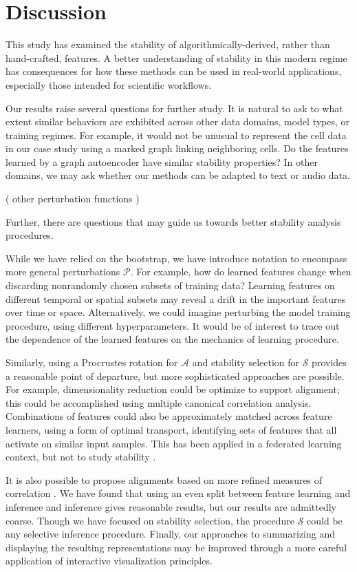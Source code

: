 
\section{Discussion}

This study has examined the stability of algorithmically-derived, rather than
hand-crafted, features. A better understanding of stability in this modern
regime has consequences for how these methods can be used in real-world
applications, especially those intended for scientific workflows.

Our results raise several questions for further study. It is natural to ask
to what extent similar behaviors are exhibited across other data domains, model
types, or training regimes. For example, it would not be unusual to represent
the cell data in our case study using a marked graph linking neighboring cells.
Do the features learned by a graph autoencoder have similar stability
properties? In other domains, we may ask whether our methods can be adapted to
text or audio data.

( other perturbation functions )

Further, there are questions that may guide us towards better stability analysis
procedures.

While we have relied on the bootstrap, we have introduce notation to encompass
more general perturbations $\mathcal{P}$. For example, how do learned features
change when discarding nonrandomly chosen subsets of training data? Learning
features on different temporal or spatial subsets may reveal a drift in the
important features over time or space. Alternatively, we could imagine
perturbing the model training procedure, using different hyperparameters. It
would be of interest to trace out the dependence of the learned features on the
mechanics of learning procedure.

Similarly, using a Procrustes rotation for $\mathcal{A}$ and stability selection
for $\mathcal{S}$ provides a reasonable point of departure, but more
sophisticated approaches are possible. For example, dimensionality reduction
could be optimize to support alignment; this could be accomplished using
multiple canonical correlation analysis. Combinations of features could also be
approximately matched across feature learners, using a form of optimal
transport, identifying sets of features that all activate on similar input
samples. This has been applied in a federated learning context, but not to study
stability \citep{wang2020federated}.

It is also possible to propose alignments based on more refined measures of
correlation \citep{josse2016measuring, azadkia2019simple}. We have found that
using an even split between feature learning and inference and inference gives
reasonable results, but our results are admittedly coarse. Though we have
focused on stability selection, the procedure $\mathcal{S}$ could be any
selective inference procedure. Finally, our approaches to summarizing and
displaying the resulting representations may be improved through a more careful
application of interactive visualization principles.

